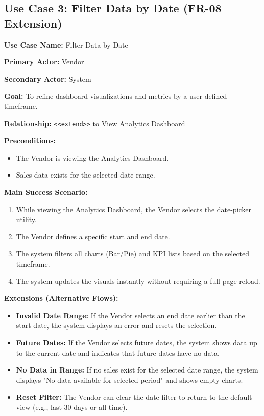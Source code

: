\subsection*{Use Case 3: Filter Data by Date (FR-08 Extension)}

\textbf{Use Case Name:} Filter Data by Date

\textbf{Primary Actor:} Vendor

\textbf{Secondary Actor:} System

\textbf{Goal:} To refine dashboard visualizations and metrics by a user-defined timeframe.

\textbf{Relationship:} \texttt{\textless\textless extend\textgreater\textgreater} to View Analytics Dashboard

\textbf{Preconditions:}
\begin{itemize}
    \item The Vendor is viewing the Analytics Dashboard.
    \item Sales data exists for the selected date range.
\end{itemize}

\textbf{Main Success Scenario:}
\begin{enumerate}
    \item While viewing the Analytics Dashboard, the Vendor selects the date-picker utility.
    \item The Vendor defines a specific start and end date.
    \item The system filters all charts (Bar/Pie) and KPI lists based on the selected timeframe.
    \item The system updates the visuals instantly without requiring a full page reload.
\end{enumerate}

\textbf{Extensions (Alternative Flows):}
\begin{itemize}
    \item[2a.] \textbf{Invalid Date Range:} If the Vendor selects an end date earlier than the start date, the system displays an error and resets the selection.
    
    \item[2b.] \textbf{Future Dates:} If the Vendor selects future dates, the system shows data up to the current date and indicates that future dates have no data.
    
    \item[3a.] \textbf{No Data in Range:} If no sales exist for the selected date range, the system displays "No data available for selected period" and shows empty charts.
    
    \item[4a.] \textbf{Reset Filter:} The Vendor can clear the date filter to return to the default view (e.g., last 30 days or all time).
\end{itemize}

